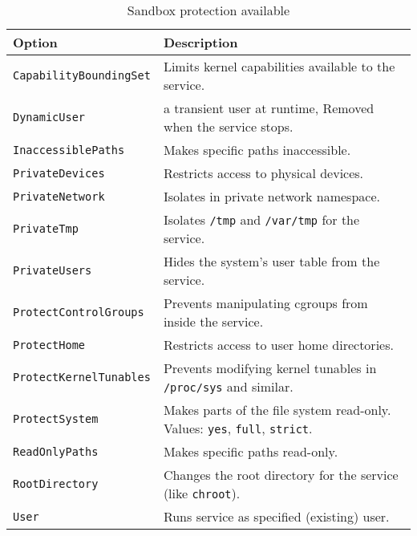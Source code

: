 \documentclass[openany, 12pt]{book}
\begin{document}
\begin{table}
  \begin{tabular}{ll}
    \toprule
    \textbf{Option}                & \textbf{Description}                                                                            \\
    \midrule
    \texttt{CapabilityBoundingSet} & Limits kernel capabilities available to the service.                                            \\
    \texttt{DynamicUser}           & a transient user at runtime, Removed when the service stops.                                    \\
    \texttt{InaccessiblePaths}     & Makes specific paths inaccessible.                                                              \\
    \texttt{PrivateDevices}        & Restricts access to physical devices.                                                           \\
    \texttt{PrivateNetwork}        & Isolates in private network namespace.                                                          \\
    \texttt{PrivateTmp}            & Isolates \texttt{/tmp} and \texttt{/var/tmp} for the service.                                   \\
    \texttt{PrivateUsers}          & Hides the system’s user table from the service.                                                 \\
    \texttt{ProtectControlGroups}  & Prevents manipulating cgroups from inside the service.                                          \\
    \texttt{ProtectHome}           & Restricts access to user home directories.                                                      \\
    \texttt{ProtectKernelTunables} & Prevents modifying kernel tunables in \texttt{/proc/sys} and similar.                           \\
    \texttt{ProtectSystem}         & Makes parts of the file system read-only. Values: \texttt{yes}, \texttt{full}, \texttt{strict}. \\
    \texttt{ReadOnlyPaths}         & Makes specific paths read-only.                                                                 \\
    \texttt{RootDirectory}         & Changes the root directory for the service (like \texttt{chroot}).                              \\
    \texttt{User}                  & Runs service as specified (existing) user.                                                      \\
    \bottomrule
  \end{tabular}
  \caption{Sandbox protection available}
\end{table}
\end{document}
